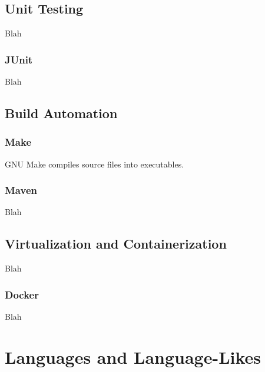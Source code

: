 
\subsection{Unit Testing}

Blah

\subsubsection{JUnit}

Blah

\subsection{Build Automation}

\subsubsection{Make}

GNU Make compiles source files into executables.



\subsubsection{Maven}

Blah


\subsection{Virtualization and Containerization}

Blah

\subsubsection{Docker}

Blah


\toclineskip
\section{Languages and Language-Likes}

